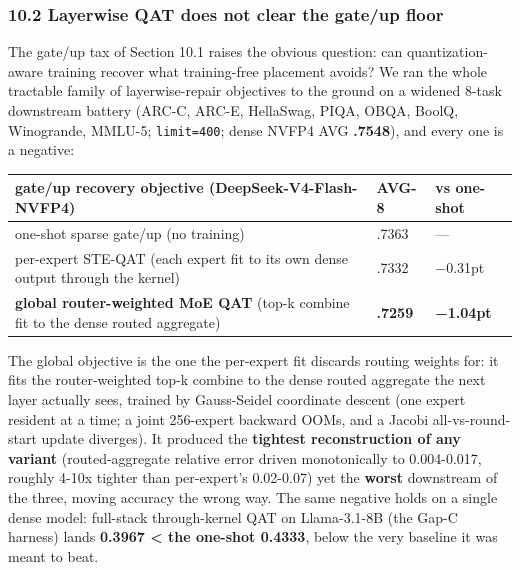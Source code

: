 \documentclass[
]{article}
\begin{document}
\subsubsection{10.2 Layerwise QAT does not clear the gate/up
floor}\label{layerwise-qat-does-not-clear-the-gateup-floor}

The gate/up tax of Section 10.1 raises the obvious question: can
quantization-aware training recover what training-free placement avoids?
We ran the whole tractable family of layerwise-repair objectives to the
ground on a widened 8-task downstream battery (ARC-C, ARC-E, HellaSwag,
PIQA, OBQA, BoolQ, Winogrande, MMLU-5; \texttt{limit=400}; dense NVFP4
AVG \textbf{.7548}), and every one is a negative:

\begin{longtable}[]{@{}
  >{\raggedright\arraybackslash}p{}
  >{\raggedright\arraybackslash}p{}
  >{\raggedright\arraybackslash}p{}@{}}
\toprule\noalign{}
\begin{minipage}[b]{\linewidth}\raggedright
gate/up recovery objective (DeepSeek-V4-Flash-NVFP4)
\end{minipage} & \begin{minipage}[b]{\linewidth}\raggedright
AVG-8
\end{minipage} & \begin{minipage}[b]{\linewidth}\raggedright
vs one-shot
\end{minipage} \\
\midrule\noalign{}
\endhead
\bottomrule\noalign{}
\endlastfoot
one-shot sparse gate/up (no training) & .7363 & --- \\
per-expert STE-QAT (each expert fit to its own dense output through the
kernel) & .7332 & −0.31pt \\
\textbf{global router-weighted MoE QAT} (top-k combine fit to the dense
routed aggregate) & \textbf{.7259} & \textbf{−1.04pt} \\
\end{longtable}

The global objective is the one the per-expert fit discards routing
weights for: it fits the router-weighted top-k combine to the dense
routed aggregate the next layer actually sees, trained by Gauss-Seidel
coordinate descent (one expert resident at a time; a joint 256-expert
backward OOMs, and a Jacobi all-vs-round-start update diverges). It
produced the \textbf{tightest reconstruction of any variant}
(routed-aggregate relative error driven monotonically to 0.004-0.017,
roughly 4-10x tighter than per-expert's 0.02-0.07) yet the
\textbf{worst} downstream of the three, moving accuracy the wrong way.
The same negative holds on a single dense model: full-stack
through-kernel QAT on Llama-3.1-8B (the Gap-C harness) lands
\textbf{0.3967 \textless{} the one-shot 0.4333}, below the very baseline
it was meant to beat.
\end{document}
